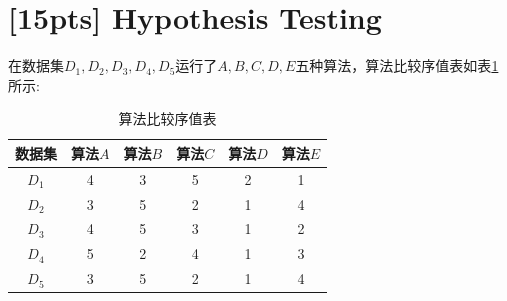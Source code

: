 \documentclass[a4paper,UTF8]{article}
\numberwithin{equation}{section}
\begin{document}
\section{[15pts] Hypothesis Testing} 
在数据集$D_1,D_2,D_3,D_4,D_5$运行了$A,B,C,D,E$五种算法，算法比较序值表如表\ref{table:ranking}所示:
\begin{table}[h]
\centering
\caption{算法比较序值表} \vspace{2mm}
\label{table:ranking}
\begin{tabular}{c|c c c c c}\hline
数据集 		& 算法$A$  	&算法$B$  	& 算法$C$ 	& 算法$D$  	&算法$E$ 	\\ \hline
$D_1$ 		& 4 		&  3  		& 5  		&  2 		& 1			\\
$D_2$ 		& 3 		&  5  		& 2  		&  1 		& 4			\\
$D_3$ 		& 4 		&  5  		& 3  		&  1 		& 2			\\ 
$D_4$ 		& 5 		&  2  		& 4  		&  1 		& 3			\\ 
$D_5$ 		& 3 		&  5  		& 2  		&  1 		& 4			\\ \hline
\end{tabular}
\end{table}
\end{document}
